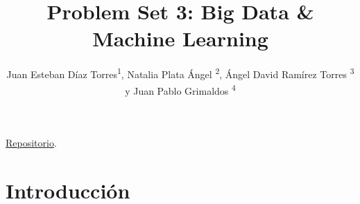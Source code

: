 \documentclass[article,11 pt]{article}
\newcommand\authormark[1]{\textsuperscript{#1}}
\begin{document}
\title{Problem Set 3: Big Data \& Machine Learning}


\author{Juan Esteban Díaz Torres\authormark{1}, Natalia Plata Ángel \authormark{2}, Ángel David Ramírez Torres \authormark{3} y Juan Pablo Grimaldos \authormark{4} }

\address{\authormark{1} 202020319
\authormark{2} 202013152 
\authormark{3} 202112704 
\authormark{4} 202122627 }

\href{https://github.com/angelramirez63/Problem-Set-3}{Repositorio}.


\section{Introducción}
\end{document}
